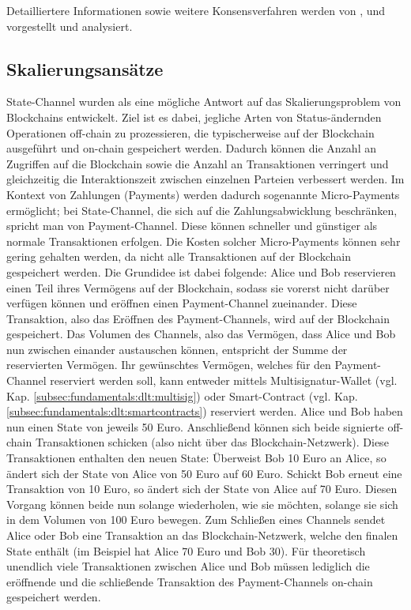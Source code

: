 Detailliertere Informationen sowie weitere Konsensverfahren werden von \cite{Salimitari2018ASO}, \cite{overview2017} und \cite{consensusIOT2018} vorgestellt und analysiert.


\subsection{Skalierungsansätze}
\label{subsec:fundamentals:dlt:scaling}
State-Channel wurden als eine mögliche Antwort auf das Skalierungsproblem von Blockchains entwickelt. Ziel ist es dabei, jegliche Arten von Status-ändernden Operationen off-chain zu prozessieren, die typischerweise auf der Blockchain ausgeführt und on-chain gespeichert werden. Dadurch können die Anzahl an Zugriffen auf die Blockchain sowie die Anzahl an Transaktionen verringert und gleichzeitig die Interaktionszeit zwischen einzelnen Parteien verbessert werden. Im Kontext von Zahlungen (Payments) werden dadurch sogenannte Micro-Payments ermöglicht; bei State-Channel, die sich auf die Zahlungsabwicklung beschränken, spricht man von Payment-Channel. Diese können schneller und günstiger als normale Transaktionen erfolgen. Die Kosten solcher Micro-Payments können sehr gering gehalten werden, da nicht alle Transaktionen auf der Blockchain gespeichert werden. Die Grundidee ist dabei folgende: Alice und Bob reservieren einen Teil ihres Vermögens auf der Blockchain, sodass sie vorerst nicht darüber verfügen können und eröffnen einen Payment-Channel zueinander. Diese Transaktion, also das Eröffnen des Payment-Channels, wird auf der Blockchain gespeichert. Das Volumen des Channels, also das Vermögen, dass Alice und Bob nun zwischen einander austauschen können, entspricht der Summe der reservierten Vermögen. Ihr gewünschtes Vermögen, welches für den Payment-Channel reserviert werden soll, kann entweder mittels Multisignatur-Wallet (vgl. Kap. \ref{subsec:fundamentals:dlt:multisig}) oder Smart-Contract (vgl. Kap. \ref{subsec:fundamentals:dlt:smartcontracts}) reserviert werden. Alice und Bob haben nun einen State von jeweils 50 Euro. Anschließend können sich beide signierte off-chain Transaktionen schicken (also nicht über das Blockchain-Netzwerk). Diese Transaktionen enthalten den neuen State: Überweist Bob 10 Euro an Alice, so ändert sich der State von Alice von 50 Euro auf 60 Euro. Schickt Bob erneut eine Transaktion von 10 Euro, so ändert sich der State von Alice auf 70 Euro. Diesen Vorgang können beide nun solange wiederholen, wie sie möchten, solange sie sich in dem Volumen von 100 Euro bewegen. Zum Schließen eines Channels sendet Alice oder Bob eine Transaktion an das Blockchain-Netzwerk, welche den finalen State enthält (im Beispiel hat Alice 70 Euro und Bob 30). Für theoretisch unendlich viele Transaktionen zwischen Alice und Bob müssen lediglich die eröffnende und die schließende Transaktion des Payment-Channels on-chain gespeichert werden.\\
